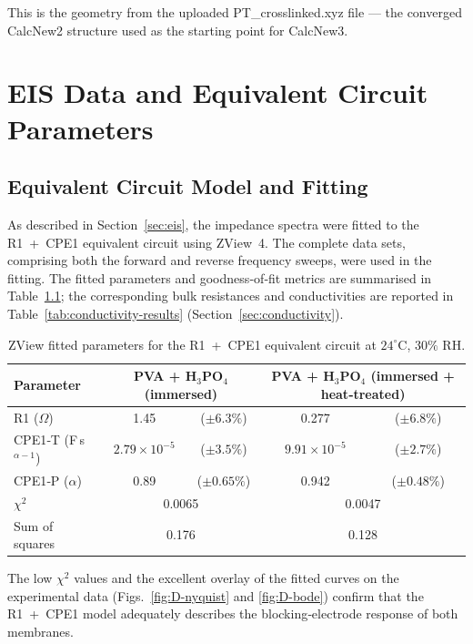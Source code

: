 \documentclass[12pt,a4paper]{report}
\begin{document}
This is the geometry from the uploaded PT\_crosslinked.xyz file — the converged CalcNew2 structure used as the starting point for CalcNew3.

\chapter{EIS Data and Equivalent Circuit Parameters}
\label{app:eis}

\section{Equivalent Circuit Model and Fitting}
\label{sec:D-equivalent-circuit}

As described in Section~\ref{sec:eis}, the impedance spectra were fitted 
to the R1~+~CPE1 equivalent circuit using ZView~4. The complete data sets, 
comprising both the forward and reverse frequency sweeps, were used in the 
fitting. The fitted parameters and goodness‑of‑fit metrics are summarised 
in Table~\ref{tab:D-fitted-params}; the corresponding bulk resistances and 
conductivities are reported in Table~\ref{tab:conductivity-results} 
(Section~\ref{sec:conductivity}).

\begin{table}[h!]
\centering
\caption{ZView fitted parameters for the R1~+~CPE1 equivalent circuit 
at $24^{\circ}\text{C}$, $30\%$ RH.}
\label{tab:D-fitted-params}
\begin{tabular}{l c c c c}
\hline
Parameter & \multicolumn{2}{c}{PVA + H$_{3}$PO$_{4}$ (immersed)} & 
\multicolumn{2}{c}{PVA + H$_{3}$PO$_{4}$ (immersed + heat‑treated)} \\
\hline
R1 ($\Omega$)               & 1.45   & ($\pm6.3\%$) & 0.277  & ($\pm6.8\%$) \\
CPE1‑T (F\,s$^{\alpha-1}$)   & $2.79\times10^{-5}$ & ($\pm3.5\%$) & $9.91\times10^{-5}$ & ($\pm2.7\%$) \\
CPE1‑P ($\alpha$)            & 0.89   & ($\pm0.65\%$) & 0.942  & ($\pm0.48\%$) \\
$\chi^{2}$                   & \multicolumn{2}{c}{0.0065} & \multicolumn{2}{c}{0.0047} \\
Sum of squares                & \multicolumn{2}{c}{0.176}  & \multicolumn{2}{c}{0.128} \\
\hline
\end{tabular}
\end{table}

The low $\chi^{2}$ values and the excellent overlay of the fitted curves 
on the experimental data (Figs.~\ref{fig:D-nyquist} and \ref{fig:D-bode}) 
confirm that the R1~+~CPE1 model adequately describes the blocking‑electrode 
response of both membranes.
\end{document}
